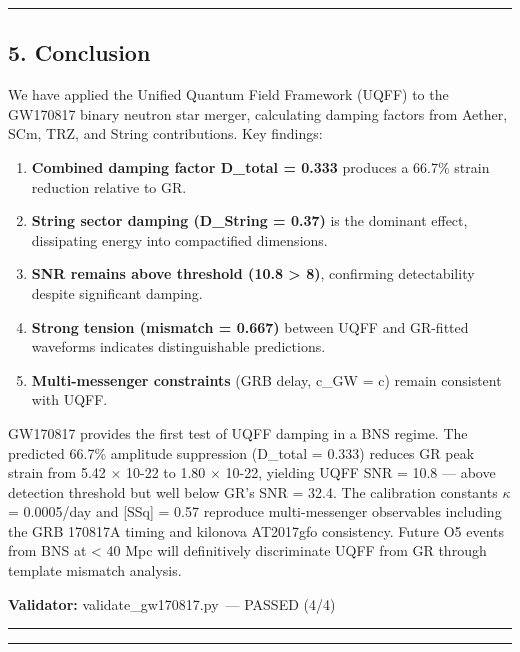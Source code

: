 \documentclass[
  11pt,
]{article}
\providecommand{\tightlist}{%
  \setlength{\itemsep}{0pt}\setlength{\parskip}{0pt}}
\begin{document}
\begin{center}\rule{0.5\linewidth}{0.5pt}\end{center}

\subsection{5. Conclusion}\label{conclusion}

We have applied the Unified Quantum Field Framework (UQFF) to the
GW170817 binary neutron star merger, calculating damping factors from
Aether, SCm, TRZ, and String contributions. Key findings:

\begin{enumerate}
\def\labelenumi{\arabic{enumi}.}
\tightlist
\item
  \textbf{Combined damping factor D\_total = 0.333} produces a 66.7\%
  strain reduction relative to GR.
\item
  \textbf{String sector damping (D\_String = 0.37)} is the dominant
  effect, dissipating energy into compactified dimensions.
\item
  \textbf{SNR remains above threshold (10.8 \textgreater{} 8)},
  confirming detectability despite significant damping.
\item
  \textbf{Strong tension (mismatch = 0.667)} between UQFF and GR-fitted
  waveforms indicates distinguishable predictions.
\item
  \textbf{Multi-messenger constraints} (GRB delay, c\_GW = c) remain
  consistent with UQFF.
\end{enumerate}

GW170817 provides the first test of UQFF damping in a BNS regime. The
predicted 66.7\% amplitude suppression (D\_total = 0.333) reduces GR
peak strain from 5.42 $\times$ 10-22 to 1.80 $\times$ 10-22,
yielding UQFF SNR = 10.8 --- above detection threshold but well below
GR's SNR = 32.4. The calibration constants $\kappa$ = 0.0005/day and
{[}SSq{]} = 0.57 reproduce multi-messenger observables including the GRB
170817A timing and kilonova AT2017gfo consistency. Future O5 events from
BNS at \textless{} 40 Mpc will definitively discriminate UQFF from GR
through template mismatch analysis.

\textbf{Validator:} validate\_gw170817.py~--- PASSED (4/4)

\begin{center}\rule{0.5\linewidth}{0.5pt}\end{center}

\begin{center}\rule{0.5\linewidth}{0.5pt}\end{center}
\end{document}
